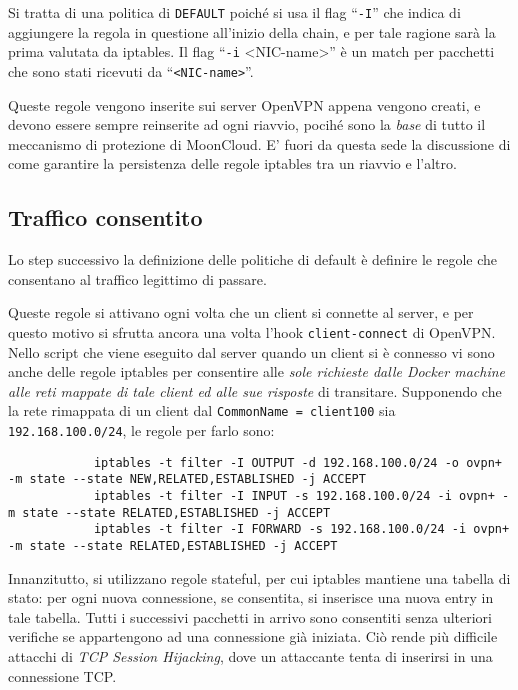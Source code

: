 		Si tratta di una politica di \texttt{DEFAULT} poiché si usa il flag ``\texttt{-I}''
		che indica di aggiungere la regola in questione all'inizio della chain, e per tale
		ragione sarà la prima valutata da iptables. Il flag ``\texttt{-i} <NIC-name>'' è un match
		per pacchetti che sono stati ricevuti da ``\texttt{<NIC-name>}''.
				
				
		Queste regole vengono inserite sui server OpenVPN appena vengono creati, e
		devono essere sempre reinserite ad ogni riavvio, pocihé sono la \textit{base}
		di tutto il meccanismo di protezione di MoonCloud. E' fuori da questa sede la discussione
		di come garantire la persistenza delle regole iptables tra un riavvio e l'altro.
				
				
		\subsection{Traffico consentito}
		Lo step successivo la definizione delle politiche di default è definire le regole che
		consentano al traffico legittimo di passare.
				
		Queste regole si attivano ogni volta che un client si connette al server, e per
		questo motivo si sfrutta ancora una volta l'hook \texttt{client-connect} di OpenVPN.
		Nello script che viene eseguito dal server quando un client si è connesso vi sono
		anche delle regole iptables per consentire alle \textit{sole richieste
		dalle Docker machine alle reti mappate di tale client ed alle sue risposte}
		di transitare.
		Supponendo che la rete rimappata di un client dal \texttt{CommonName = client100} sia
		\texttt{192.168.100.0/24}, le regole per farlo sono:
		\begin{verbatim}
			iptables -t filter -I OUTPUT -d 192.168.100.0/24 -o ovpn+ -m state --state NEW,RELATED,ESTABLISHED -j ACCEPT
			iptables -t filter -I INPUT -s 192.168.100.0/24 -i ovpn+ -m state --state RELATED,ESTABLISHED -j ACCEPT
			iptables -t filter -I FORWARD -s 192.168.100.0/24 -i ovpn+ -m state --state RELATED,ESTABLISHED -j ACCEPT
		\end{verbatim}
				
		Innanzitutto, si utilizzano regole stateful, per cui iptables mantiene
		una tabella di stato: per ogni nuova connessione, se consentita, si inserisce
		una nuova entry in tale tabella. Tutti i successivi pacchetti in arrivo sono consentiti
		senza ulteriori verifiche
		se appartengono ad una connessione già iniziata.
		Ciò rende più difficile
		attacchi di \textit{TCP Session Hijacking}, dove un attaccante tenta di inserirsi in
		una connessione TCP.
				
